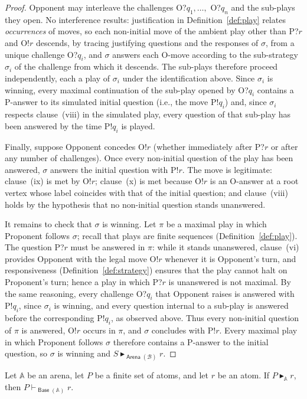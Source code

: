 \documentclass{lipics-v2021}
\newcommand{\deriv}[1]{\vdash_{#1}}       %
\newcommand{\supp}[1]{\Vdash_{#1}}
\newcommand{\wstrat}[1]{\blacktriangleright_{#1}}            %
\newcommand{\base}[1]{\mathcal{#1}}                    %
\newcommand{\arena}[1]{\mathbb{#1}}                     %
\newcommand{\tobase}[1]{\mathrel{\textsf{Base}}(#1)}            %
\newcommand{\toarena}[1]{\mathrel{\textsf{Arena}}(#1)}           %
\begin{document}
\begin{proof}
Opponent may interleave the challenges O?$q_1, \ldots,$ O?$q_n$ and the
sub-plays they open. No interference results: justification in
Definition~\ref{def:play} relates \emph{occurrences} of moves, so each
non-initial move of the ambient play other than P?$r$ and O!$r$ descends, by
tracing justifying questions and the responses of $\sigma$, from a unique
challenge O?$q_i$, and $\sigma$ answers each O-move according to the
sub-strategy $\sigma_i$ of the challenge from which it descends. The
sub-plays therefore proceed independently, each a play of $\sigma_i$ under
the identification above. Since $\sigma_i$ is winning, every maximal
continuation of the sub-play opened by O?$q_i$ contains a P-answer to its
simulated initial question
(i.e., the move P!$q_i$)
and, since
$\sigma_i$ respects clause~(viii) in the simulated play, every question of
that sub-play has been answered by the time P!$q_i$ is played.
 
Finally, suppose Opponent concedes O!$r$ (whether immediately after P?$r$ or
after any number of challenges). Once every non-initial question of the play
has been answered, $\sigma$ answers the initial question with P!$r$. The move
is legitimate: clause~(ix) is met by O!$r$; clause~(x) is met because O!$r$
is an O-answer at a root vertex whose label coincides with that of the
initial question; and clause~(viii) holds by the hypothesis that no
non-initial question stands unanswered.
 
It remains to check that $\sigma$ is winning. Let $\pi$ be a maximal play in
which Proponent follows $\sigma$; recall that plays are finite sequences
(Definition~\ref{def:play}). The question P?$r$ must be answered in $\pi$:
while it stands unanswered, clause~(vi) provides Opponent with the legal move
O!$r$ whenever it is Opponent's turn, and responsiveness
(Definition~\ref{def:strategy}) ensures that the play cannot halt on
Proponent's turn; hence a play in which P?$r$ is unanswered is not maximal.
By the same reasoning, every challenge O?$q_i$ that Opponent raises is
answered with P!$q_i$, since $\sigma_i$ is winning, and every question
internal to a sub-play is answered before the corresponding P!$q_i$, as
observed above. Thus every non-initial question of $\pi$ is answered, O!$r$
occurs in $\pi$, and $\sigma$ concludes with P!$r$. Every maximal play in
which Proponent follows $\sigma$ therefore contains a P-answer to the initial
question, so $\sigma$ is winning and $S \wstrat{\toarena{\base{B}}} r$.
\end{proof}
\begin{theorem}
\label{thm:strategy-derivability}
    Let $\arena{A}$ be an arena, let $P$ be a finite set of atoms, and let
    $r$ be an atom. If $P \wstrat{\arena{A}} r$, then
    $P \deriv{\tobase{\arena{A}}} r$.
\end{theorem}
\end{document}
